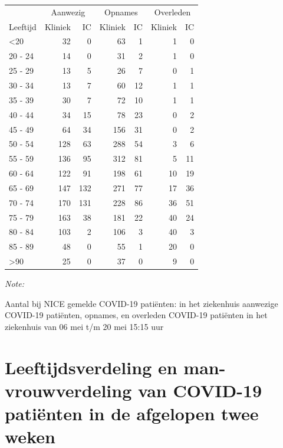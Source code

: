 \documentclass[
  english,
  man,floatsintext]{apa6}
\begin{document}
\begin{table}
\centering\begingroup\fontsize{10}{12}\selectfont

\begin{threeparttable}
\begin{tabular}{lrrrrrr}
\toprule
\multicolumn{1}{c}{ } & \multicolumn{2}{c}{Aanwezig} & \multicolumn{2}{c}{Opnames} & \multicolumn{2}{c}{Overleden} \\
\cmidrule(l{3pt}r{3pt}){2-3} \cmidrule(l{3pt}r{3pt}){4-5} \cmidrule(l{3pt}r{3pt}){6-7}
Leeftijd & Kliniek & IC & Kliniek & IC & Kliniek & IC\\
\midrule
<20 & 32 & 0 & 63 & 1 & 1 & 0\\
20 - 24 & 14 & 0 & 31 & 2 & 1 & 0\\
25 - 29 & 13 & 5 & 26 & 7 & 0 & 1\\
30 - 34 & 13 & 7 & 60 & 12 & 1 & 1\\
35 - 39 & 30 & 7 & 72 & 10 & 1 & 1\\
40 - 44 & 34 & 15 & 78 & 23 & 0 & 2\\
45 - 49 & 64 & 34 & 156 & 31 & 0 & 2\\
50 - 54 & 128 & 63 & 288 & 54 & 3 & 6\\
55 - 59 & 136 & 95 & 312 & 81 & 5 & 11\\
60 - 64 & 122 & 91 & 198 & 61 & 10 & 19\\
65 - 69 & 147 & 132 & 271 & 77 & 17 & 36\\
70 - 74 & 170 & 131 & 228 & 86 & 36 & 51\\
75 - 79 & 163 & 38 & 181 & 22 & 40 & 24\\
80 - 84 & 103 & 2 & 106 & 3 & 40 & 3\\
85 - 89 & 48 & 0 & 55 & 1 & 20 & 0\\
>90 & 25 & 0 & 37 & 0 & 9 & 0\\
\bottomrule
\end{tabular}
\begin{tablenotes}
\item \textit{Note: } 
\item Aantal bij NICE gemelde COVID-19 patiënten: in het ziekenhuis aanwezige COVID-19 patiënten, opnames, en overleden COVID-19 patiënten in het ziekenhuis van 06 mei t/m 20 mei 15:15 uur
\end{tablenotes}
\end{threeparttable}
\endgroup{}
\end{table}

\newpage

\hypertarget{leeftijdsverdeling-en-man-vrouwverdeling-van-covid-19-patiuxebnten-in-de-afgelopen-twee-weken}{%
\section{Leeftijdsverdeling en man-vrouwverdeling van COVID-19 patiënten in de afgelopen twee weken}\label{leeftijdsverdeling-en-man-vrouwverdeling-van-covid-19-patiuxebnten-in-de-afgelopen-twee-weken}}
\end{document}
